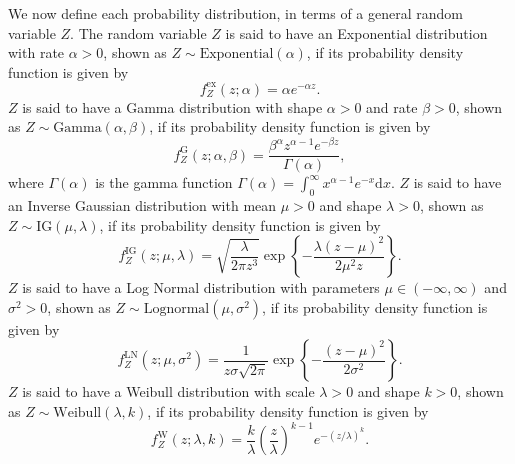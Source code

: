 \documentclass[oneside, 12 pt]{book}
\begin{document}
We now define each probability distribution, in terms of a general random variable $Z$.  
The random variable $Z$ is said to have an Exponential distribution with rate $\alpha >0$, shown as $Z \sim \text{Exponential}(\alpha)$, if its probability density function is given by
\begin{equation}\label{eq:origExp}
	f^\mathrm{ex}_Z (z ; \alpha ) = \alpha e^{-\alpha z}.
\end{equation}
$Z$ is said to have a Gamma distribution with shape $\alpha >0$ and rate $\beta >0$, shown as $Z \sim \text{Gamma}(\alpha,\beta)$, if its probability density function is given by 
\begin{equation}\label{eq:origGamma}
	 f^\mathrm{G}_Z(z; \alpha, \beta ) = \frac{\beta^\alpha z^{\alpha-1} e^{-\beta z}}{\Gamma(\alpha)},
\end{equation}
where $\Gamma(\alpha)$ is the gamma function $\Gamma(\alpha) = \int^\infty_0 x^{\alpha-1}e^{-x}\mathrm{d}x$.
  $Z$ is said to have an Inverse Gaussian distribution with mean $\mu >0$ and shape $\lambda >0$, shown as $Z \sim \text{IG}(\mu,\lambda)$, if its probability density function is given by 
  \begin{equation}\label{eq:origIG}
  	f^\mathrm{IG}_Z(z; \mu, \lambda) =\sqrt{\frac{\lambda}{2 \pi z^3}} \exp \left\{- \frac{\lambda(z-\mu)^2}{2\mu^2 z} \right\}.
  \end{equation}
  $Z$ is said to have a Log Normal distribution with parameters $\mu \in (-\infty, \infty)$ and $\sigma^2 >0$, shown as $Z \sim \text{Lognormal}(\mu,\sigma^2)$, if its probability density function is given by 
  \begin{equation}\label{eq:origLN}
  	f^\mathrm{LN}_Z(z; \mu, \sigma^2) = \frac{1}{z\sigma \sqrt{2\pi}} \exp \left\{- \frac{\left( z-\mu \right)^2}{2\sigma^2} \right\}.
  \end{equation}
   $Z$ is said to have a Weibull distribution with scale $\lambda >0$ and shape $k >0$, shown as $Z \sim \text{Weibull}(\lambda, k)$, if its probability density function is given by
   \begin{equation}\label{eq:origWei}
   	f^\mathrm{W}_Z(z ; \lambda, k ) = \frac{k}{\lambda}\left( \frac{z}{\lambda}\right)^{k-1} e^{-\left( z/\lambda\right)^k}.
   \end{equation} 
 



\end{document}
